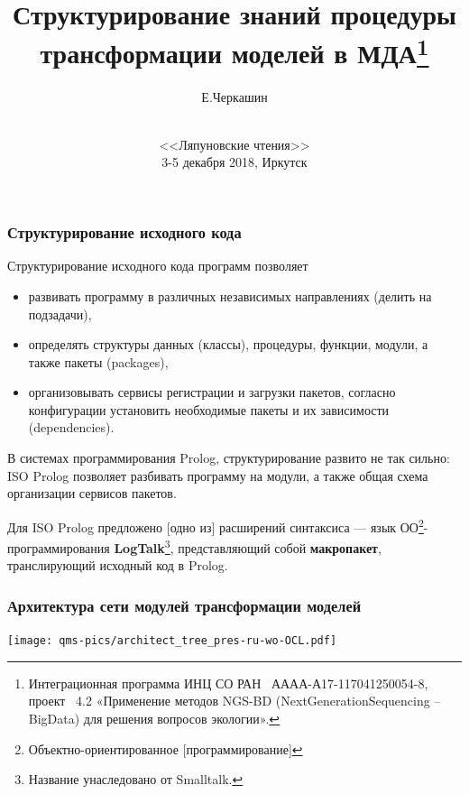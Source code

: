 \documentclass[10pt]{beamer}
\begin{document}
\title[Структурирование знаний в MDA]{Структурирование знаний процедуры трансформации моделей в МДА\thanks{Интеграционная программа ИНЦ СО РАН \textnumero~АААА-А17-117041250054-8, проект \textnumero~4.2 «Применение методов NGS-BD (NextGenerationSequencing – BigData) для решения вопросов экологии».}}
\author{Е.Черкашин}
\date[2018]{{}\\[1.5cm]
<<Ляпуновские чтения>>\\
3-5 декабря 2018, Иркутск
}
\maketitle

\begin{frame}
  \frametitle{Структурирование исходного кода}
  \begin{block}{Структурирование исходного кода программ позволяет}
  \begin{itemize}
  \item развивать программу в различных независимых направлениях (делить на подзадачи),
  \item определять структуры данных (классы), процедуры, функции, модули, а также пакеты (packages),
  \item организовывать сервисы регистрации и загрузки пакетов, согласно конфигурации установить необходимые пакеты и их зависимости (dependencies).
  \end{itemize}
\end{block}
  В системах программирования Prolog, структурирование развито не так сильно: ISO Prolog позволяет  разбивать программу на модули, а также общая схема организации сервисов пакетов.

Для ISO Prolog предложено [одно из] расширений синтаксиса --- язык ОО\footnote{Объектно-ориентированное [программирование]}-программирования \textbf{LogTalk}\footnote{Название унаследовано от Smalltalk.}, представляющий собой \textbf{макропакет}, транслирующий исходный код в Prolog.

\end{frame}

\begin{frame}
  \frametitle{Архитектура сети модулей трансформации моделей}
  \centering
  \texttt{[image: qms-pics/architect\_tree\_pres-ru-wo-OCL.pdf]}
\end{frame}
\end{document}
